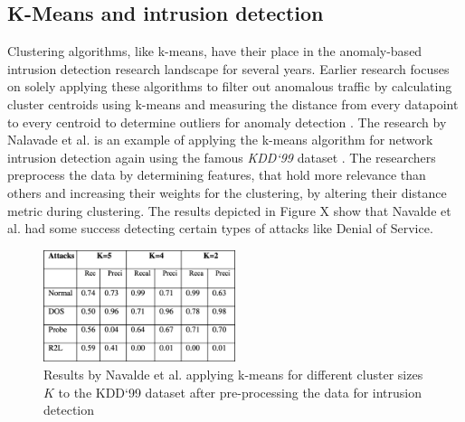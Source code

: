 \documentclass[
    fontsize=12pt,
    headings=small,
    parskip=half,           %
    bibliography=totoc,
    numbers=noenddot,       %
    open=any,               %
    ]{scrreprt}
\begin{document}
\subsection{K-Means and intrusion detection}
\label{subsec:k_means_intrusion_detection}
Clustering algorithms, like k-means, have their place in the anomaly-based intrusion detection research landscape for several years. Earlier research focuses on solely applying these algorithms to filter out anomalous traffic by calculating cluster centroids using k-means and measuring the distance from every datapoint to every centroid to determine outliers for anomaly detection \cite{munz2007traffic}. The research by Nalavade et al. \cite{nalavade2014} is an example of applying the k-means algorithm for network intrusion detection again using the famous \emph{KDD`99} dataset \cite{kdd1999}. The researchers preprocess the data by determining features, that hold more relevance than others and increasing their weights for the clustering, by altering their distance metric during clustering. The results depicted in Figure X show that Navalde et al. had some success detecting certain types of attacks like Denial of Service. 

\begin{figure}[H]
	\sffamily\footnotesize
	\includegraphics[width=0.5\textwidth]{pic/navalde_k_means.png}
	\unitlength=0.75mm
	\linethickness{0.4pt}
	\caption{Results by Navalde et al. applying k-means for different cluster sizes $K$ to the KDD`99 dataset after pre-processing the data for intrusion detection \cite{nalavade2014}}
	\label{fig:k_means_navalde}
\end{figure}
\end{document}
